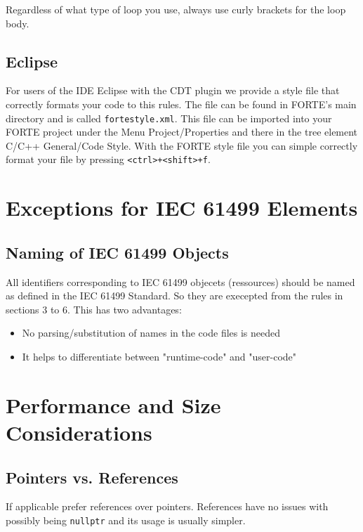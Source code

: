 \documentclass[final,a4paper,10pt, oneside]{article}
\begin{document}
Regardless of what type of loop you use, always use curly brackets for the loop body.

\subsection{Eclipse}
For users of the IDE Eclipse with the CDT plugin we provide a style file that correctly formats your code to this rules. The file can be found in FORTE's main directory and is called \verb=fortestyle.xml=. This file can be imported into your FORTE project under the Menu Project/Properties and there in the tree element C/C++ General/Code Style. With the FORTE style file you can simple correctly format your file by pressing \verb=<ctrl>+<shift>+f=.

\section{Exceptions for IEC 61499 Elements}

\subsection{Naming of IEC 61499 Objects}

All identifiers corresponding to IEC 61499 objecets (ressources) should be named as defined
in the IEC 61499 Standard. So they are execepted from the rules in sections 3 to 6. This has two advantages:
\begin{itemize}
\item No parsing/substitution of names in the code files is needed
\item It helps to differentiate between "runtime-code" and "user-code"
\end{itemize}

\section{Performance and Size Considerations}

\subsection{Pointers vs. References}
If applicable prefer references over pointers.
References have no issues with possibly being \verb|nullptr| and its usage is usually simpler.
\end{document}
